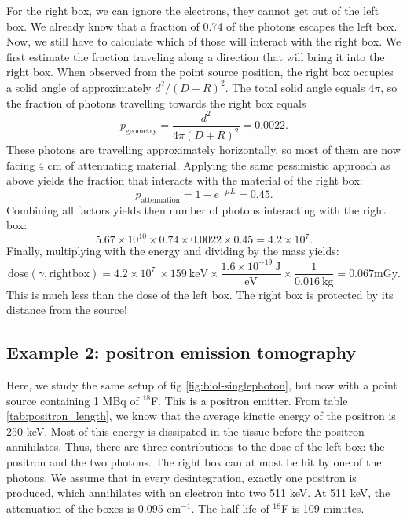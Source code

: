 \documentclass[11pt,oneside]{article}
\begin{document}
For the right box, we can ignore the electrons, they cannot get out of the
left box.  We already know that a fraction of 0.74 of the photons escapes the
left box. Now, we still have to calculate which of those will interact with
the right box. We first estimate the fraction traveling along a direction that
will bring it into the right box.  When observed from the point source
position, the right box occupies a solid angle of approximately $d^2 / (D +
R)^2$. The total solid angle equals $4 \pi$, so the fraction of photons
travelling towards the right box equals
\begin{equation}
  p_{\mbox{geometry}} = \frac{d^2}{4 \pi (D + R)^2} = 0.0022.
\end{equation}
These photons are travelling approximately horizontally, so most of them are
now facing 4 cm of attenuating material. Applying the same pessimistic
approach as above yields the fraction that interacts with the material of the
right box:
\begin{equation}
  p_{\mbox{attenuation}} = 1 - e^{- \mu L} = 0.45.
\end{equation}
Combining all factors yields then number of photons interacting with the right box:
\begin{equation}
  5.67 \times 10^{10} \times 0.74 \times 0.0022 \times 0.45 = 4.2 \times 10^7.
\end{equation}
Finally, multiplying with the energy and dividing by the mass yields:
\begin{equation}
  \mbox{dose}(\gamma, \mbox{rightbox}) = 4.2 \times 10^7\ \times 159\ \mbox{keV}
  \times \frac{1.6 \times 10^{-19} \ \mbox{J}}{\mbox{eV}}
   \times \frac{1}{ 0.016 \ \mbox{kg}}
   = 0.067 \mbox{mGy}.
\end{equation}
This is much less than the dose of the left box. The right box is protected by its
distance from the source!


\subsection{Example 2: positron emission tomography}
Here, we study the same setup of fig \ref{fig:biol-singlephoton}, but
now with a point source containing 1 MBq of $^{18}$F. This is a
positron emitter. From table \ref{tab:positron_length}, we know that
the average kinetic energy of the positron is 250 keV. Most of this
energy is dissipated in the tissue before the positron
annihilates. Thus, there are three contributions to the dose of the
left box: the positron and the two photons. The right box can at most
be hit by one of the photons.
%
We assume that in every desintegration, exactly one positron is
produced, which annihilates with an electron into two 511 keV.  At 511
keV, the attenuation of the boxes is 0.095 cm$^{-1}$. The half life of
$^{18}$F is 109 minutes.
\end{document}
